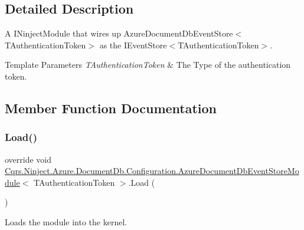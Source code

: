 \subsection{Detailed Description}
A I\+Ninject\+Module that wires up Azure\+Document\+Db\+Event\+Store$<$\+T\+Authentication\+Token$>$ as the I\+Event\+Store$<$\+T\+Authentication\+Token$>$. 


\begin{DoxyTemplParams}{Template Parameters}
{\em T\+Authentication\+Token} & The Type of the authentication token.\\
\hline
\end{DoxyTemplParams}


\subsection{Member Function Documentation}
\mbox{\label{classCqrs_1_1Ninject_1_1Azure_1_1DocumentDb_1_1Configuration_1_1AzureDocumentDbEventStoreModule_a5b131fff27bf3787fa762bd5dc364bdd_a5b131fff27bf3787fa762bd5dc364bdd}} 
\subsubsection{\texorpdfstring{Load()}{Load()}}
{\footnotesize\ttfamily override void \hyperlink{classCqrs_1_1Ninject_1_1Azure_1_1DocumentDb_1_1Configuration_1_1AzureDocumentDbEventStoreModule}{Cqrs.\+Ninject.\+Azure.\+Document\+Db.\+Configuration.\+Azure\+Document\+Db\+Event\+Store\+Module}$<$ T\+Authentication\+Token $>$.Load (\begin{DoxyParamCaption}{ }\end{DoxyParamCaption})}



Loads the module into the kernel. 

